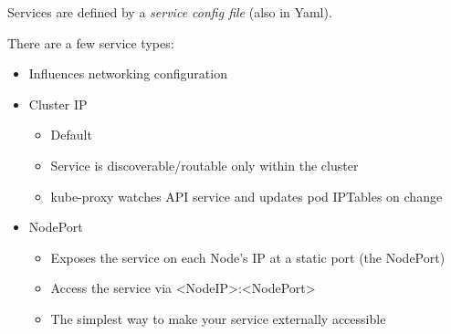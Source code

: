 \documentclass[11pt,a4paper,titlepage,dvipsnames,cmyk]{scrartcl}
\begin{document}
Services are defined by a \textit{service config file} (also in Yaml).

There are a few service types:
\begin{itemize}
    \item Influences networking configuration
    \item Cluster IP
    \begin{itemize}
        \item Default
        \item Service is discoverable/routable only within the cluster
        \item kube-proxy watches API service and updates pod IPTables on change
    \end{itemize}
    \item NodePort
    \begin{itemize}
        \item Exposes the service on each Node's IP at a static port (the NodePort)
        \item Access the service via <NodeIP>:<NodePort>
        \item The simplest way to make your service externally accessible
    \end{itemize}
\end{itemize}
\end{document}
